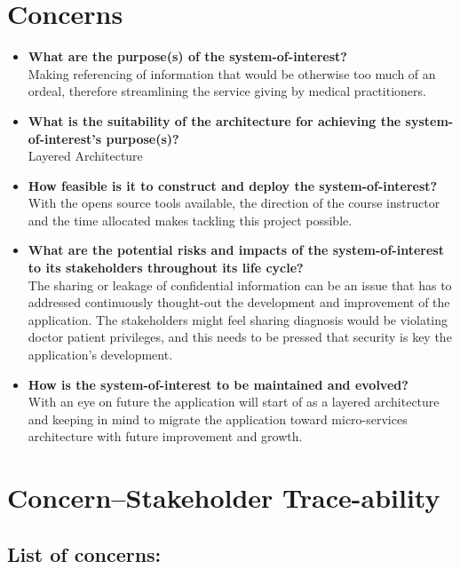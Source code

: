 \documentclass[10pt,oneside]{report}
\begin{document}
\section{Concerns}\label{ad:concerns}

\begin{itemize}
\item \textbf{What are the purpose(s) of the system-of-interest?} \\
Making referencing of information that would be otherwise too much of an ordeal, therefore streamlining the service giving by medical practitioners.
\item \textbf{What is the suitability of the architecture for achieving the system-of-interest's purpose(s)?} \\
Layered Architecture
\item \textbf{How feasible is it to construct and deploy the system-of-interest?} \\
With the opens source tools available, the direction of the course instructor and the time allocated makes tackling this project possible.
\item \textbf{What are the potential risks and impacts of the system-of-interest to its stakeholders throughout its life cycle?} \\
The sharing or leakage of confidential information can be an issue that has to addressed continuously thought-out the development and improvement of the application. The stakeholders might feel sharing diagnosis would be violating doctor patient privileges, and this needs to be pressed that security is key the application's development. 
\item \textbf{How is the system-of-interest to be maintained and evolved?} \\
With an eye on future the application will start of as a layered architecture and keeping in mind to migrate the application toward micro-services architecture with future improvement and growth.
\end{itemize}

\section{Concern--Stakeholder Trace-ability}

\subsection{List of concerns:}
\end{document}
